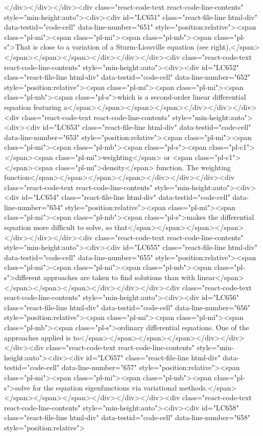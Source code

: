 {{{{{{{{</div></div></div><div class="react-code-text react-code-line-contents" style="min-height:auto"><div><div id="LC651" class="react-file-line html-div" data-testid="code-cell" data-line-number="651" style="position:relative"><span class="pl-mi"><span class="pl-mi"><span class="pl-mb"><span class="pl-s">That is close to a variation of a Sturm-Liouville equation (see right),</span></span></span></span></div></div></div><div class="react-code-text react-code-line-contents" style="min-height:auto"><div><div id="LC652" class="react-file-line html-div" data-testid="code-cell" data-line-number="652" style="position:relative"><span class="pl-mi"><span class="pl-mi"><span class="pl-mb"><span class="pl-s">which is a second-order linear differential equation featuring a</span></span></span></span></div></div></div><div class="react-code-text react-code-line-contents" style="min-height:auto"><div><div id="LC653" class="react-file-line html-div" data-testid="code-cell" data-line-number="653" style="position:relative"><span class="pl-mi"><span class="pl-mi"><span class="pl-mb"><span class="pl-s"><span class="pl-c1">\emph</span>{<span class="pl-mi">weighting</span>} or <span class="pl-c1">\emph</span>{<span class="pl-mi">density</span>} function. The weighting function</span></span></span></span></div></div></div><div class="react-code-text react-code-line-contents" style="min-height:auto"><div><div id="LC654" class="react-file-line html-div" data-testid="code-cell" data-line-number="654" style="position:relative"><span class="pl-mi"><span class="pl-mi"><span class="pl-mb"><span class="pl-s">makes the differential equation more difficult to solve, so that</span></span></span></span></div></div></div><div class="react-code-text react-code-line-contents" style="min-height:auto"><div><div id="LC655" class="react-file-line html-div" data-testid="code-cell" data-line-number="655" style="position:relative"><span class="pl-mi"><span class="pl-mi"><span class="pl-mb"><span class="pl-s">different approaches are taken to find solutions than with linear</span></span></span></span></div></div></div><div class="react-code-text react-code-line-contents" style="min-height:auto"><div><div id="LC656" class="react-file-line html-div" data-testid="code-cell" data-line-number="656" style="position:relative"><span class="pl-mi"><span class="pl-mi"><span class="pl-mb"><span class="pl-s">ordinary differential equations. One of the approaches applied is to</span></span></span></span></div></div></div><div class="react-code-text react-code-line-contents" style="min-height:auto"><div><div id="LC657" class="react-file-line html-div" data-testid="code-cell" data-line-number="657" style="position:relative"><span class="pl-mi"><span class="pl-mi"><span class="pl-mb"><span class="pl-s">solve for the equation eigenfunctions via variational methods.</span></span></span></span></div></div></div><div class="react-code-text react-code-line-contents" style="min-height:auto"><div><div id="LC658" class="react-file-line html-div" data-testid="code-cell" data-line-number="658" style="position:relative">
}}}}}}}}
